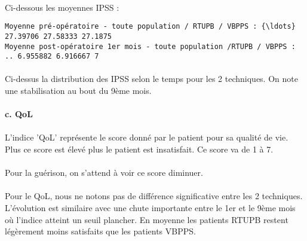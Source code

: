\documentclass[11pt]{article}
\begin{document}
\paragraph{}Ci-dessous les moyennes IPSS :



    \begin{Verbatim}[commandchars=\\\{\}]
Moyenne pré-opératoire - toute population / RTUPB / VBPPS : {\ldots} 27.39706 27.58333 27.1875 
Moyenne post-opératoire 1er mois - toute population /RTUPB / VBPPS : .. 6.955882 6.916667 7 

    \end{Verbatim}



    \begin{center}
    \end{center}
    
    
\paragraph{}
Ci-dessus la distribution des IPSS selon le temps pour les 2 techniques.
On note une stabilisation au bout du 9ème mois.

    \paragraph{c. QoL}\label{c.-qol}

\paragraph{}
L'indice 'QoL' représente le score donné par le patient pour sa qualité
de vie. Plus ce score est élevé plus le patient est insatisfait. Ce
score va de 1 à 7.
\paragraph{}
Pour la guérison, on s'attend à voir ce score diminuer.



    \begin{center}
    \end{center}
    
    
\paragraph{}Pour le QoL, nous ne notons pas de différence significative entre les 2
techniques. L'évolution est similaire avec une chute importante entre le
1er et le 9ème mois où l'indice atteint un seuil plancher. En moyenne
les patients RTUPB restent légèrement moins satisfaits que les patients
VBPPS.
\end{document}
